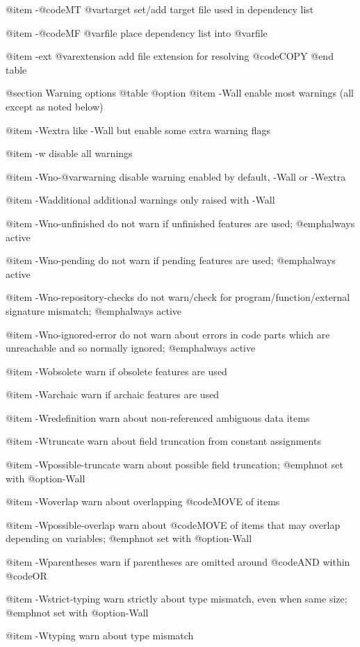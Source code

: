 @item -@code{MT} @var{target}
set/add target file used in dependency list

@item -@code{MF} @var{file}
place dependency list into @var{file}

@item -ext @var{extension}
add file extension for resolving @code{COPY}
@end table

@section Warning options
@table @option
@item -Wall
enable most warnings (all except as noted below)

@item -Wextra
like -Wall but enable some extra warning flags

@item -w
disable all warnings

@item -Wno-@var{warning}
disable warning enabled by default, -Wall or -Wextra

@item -Wadditional
additional warnings only raised with -Wall

@item -Wno-unfinished
do not warn if unfinished features are used; @emph{always} active

@item -Wno-pending
do not warn if pending features are used; @emph{always} active

@item -Wno-repository-checks
do not warn/check for program/function/external signature mismatch; @emph{always} active

@item -Wno-ignored-error
do not warn about errors in code parts which are unreachable and so normally ignored; @emph{always} active

@item -Wobsolete
warn if obsolete features are used

@item -Warchaic
warn if archaic features are used

@item -Wredefinition
warn about non-referenced ambiguous data items

@item -Wtruncate
warn about field truncation from constant assignments

@item -Wpossible-truncate
warn about possible field truncation; @emph{not} set with @option{-Wall}

@item -Woverlap
warn about overlapping @code{MOVE} of items

@item -Wpossible-overlap
warn about @code{MOVE} of items that may overlap depending on variables; @emph{not} set with @option{-Wall}

@item -Wparentheses
warn if parentheses are omitted around @code{AND} within @code{OR}

@item -Wstrict-typing
warn strictly about type mismatch, even when same size; @emph{not} set with @option{-Wall}

@item -Wtyping
warn about type mismatch

